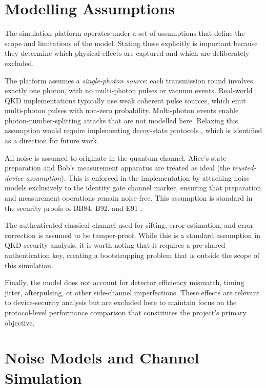 \documentclass[10pt, a4paper]{report}
\begin{document}
\section{Modelling Assumptions}

The simulation platform operates under a set of assumptions that define the scope and limitations of the model. Stating these explicitly is important because they determine which physical effects are captured and which are deliberately excluded.

The platform assumes a \textit{single-photon source}: each transmission round involves exactly one photon, with no multi-photon pulses or vacuum events. Real-world QKD implementations typically use weak coherent pulse sources, which emit multi-photon pulses with non-zero probability. Multi-photon events enable photon-number-splitting attacks that are not modelled here. Relaxing this assumption would require implementing decoy-state protocols \cite{Lo2005Decoy}, which is identified as a direction for future work.

All noise is assumed to originate in the quantum channel. Alice's state preparation and Bob's measurement apparatus are treated as ideal (the \textit{trusted-device assumption}). This is enforced in the implementation by attaching noise models exclusively to the identity gate channel marker, ensuring that preparation and measurement operations remain noise-free. This assumption is standard in the security proofs of BB84, B92, and E91 \cite{ShorPreskill2000, Scarani2009}.

The authenticated classical channel used for sifting, error estimation, and error correction is assumed to be tamper-proof. While this is a standard assumption in QKD security analysis, it is worth noting that it requires a pre-shared authentication key, creating a bootstrapping problem that is outside the scope of this simulation.

Finally, the model does not account for detector efficiency mismatch, timing jitter, afterpulsing, or other side-channel imperfections. These effects are relevant to device-security analysis but are excluded here to maintain focus on the protocol-level performance comparison that constitutes the project's primary objective.


\section{Noise Models and Channel Simulation}
\end{document}
